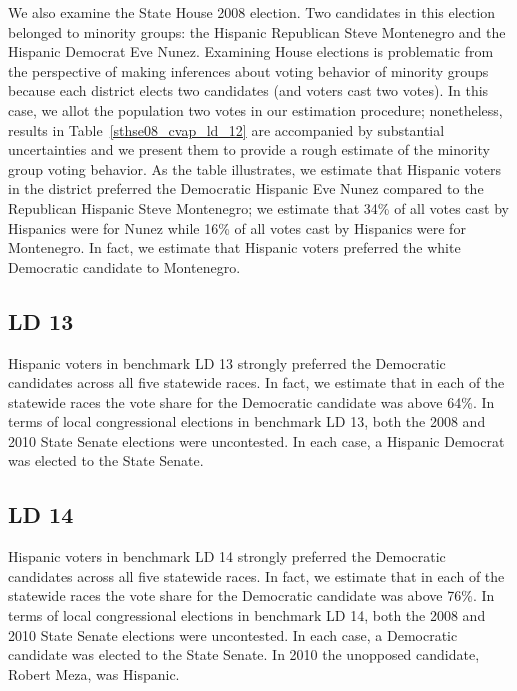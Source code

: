 \documentclass[12pt]{article}
\begin{document}
We also examine the State House 2008 election. Two candidates in this election belonged to minority groups: the Hispanic Republican Steve Montenegro and the Hispanic Democrat Eve Nunez. Examining House elections is problematic from the perspective of making inferences about voting behavior of minority groups because each district elects two candidates (and voters cast two votes). In this case, we allot the population two votes in our estimation procedure; nonetheless, results in Table~\ref{sthse08_cvap_ld_12} are accompanied by substantial uncertainties and we present them to provide a rough estimate of the minority group voting behavior. As the table illustrates, we estimate that Hispanic voters in the district  preferred the Democratic Hispanic Eve Nunez compared to the Republican Hispanic Steve Montenegro; we estimate that 34\% of all votes cast by Hispanics were for Nunez while 16\% of all votes cast by Hispanics were for Montenegro. In fact, we estimate that Hispanic voters preferred the white Democratic candidate to Montenegro. 
 
\subsection{LD 13}
Hispanic voters in benchmark LD 13 strongly preferred the Democratic candidates across all five statewide races. In fact, we estimate that in each of the statewide races the vote share for the Democratic candidate was above 64\%. In terms of local congressional elections in benchmark LD 13, both the 2008 and 2010 State Senate elections were uncontested. In each case, a Hispanic Democrat was elected to the State Senate. 

\subsection{LD 14}
Hispanic voters in benchmark LD 14 strongly preferred the Democratic candidates across all five statewide races. In fact, we estimate that in each of the statewide races the vote share for the Democratic candidate was above 76\%. In terms of local congressional elections in benchmark LD 14, both the 2008 and 2010 State Senate elections were uncontested. In each case, a Democratic candidate was elected to the State Senate. In 2010 the unopposed  candidate, Robert Meza, was Hispanic.
\end{document}
